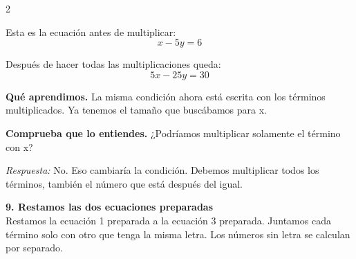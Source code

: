 \documentclass[11pt,a4paper,landscape]{article}
\begin{document}
\begin{multicols*}{2}
\begin{minipage}{\linewidth}
\par\smallskip Esta es la ecuación antes de multiplicar:
\[x - 5y = 6\]
\par{}\par\smallskip
\par\smallskip Después de hacer todas las multiplicaciones queda:
\[5x - 25y = 30\]
\par\smallskip\textbf{Qué aprendimos.} La misma condición ahora está escrita con los términos multiplicados. Ya tenemos el tamaño que buscábamos para x.
\par\smallskip\textbf{Comprueba que lo entiendes.} ¿Podríamos multiplicar solamente el término con x?\par\textit{Respuesta:} No. Eso cambiaría la condición. Debemos multiplicar todos los términos, también el número que está después del igual.
\end{minipage}\par\medskip
\noindent\begin{minipage}{\linewidth}\textbf{9. Restamos las dos ecuaciones preparadas}\\[2pt]Restamos la ecuación 1 preparada a la ecuación 3 preparada. Juntamos cada término solo con otro que tenga la misma letra. Los números sin letra se calculan por separado.
\par{}\par\smallskip

\end{minipage}
\end{multicols*}
\end{document}
